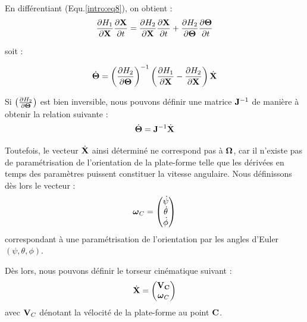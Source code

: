 En différentiant (Equ.\ref{intro:eq8}), on obtient :
\begin{equation}
\frac{\partial H_1}{\partial {\bf X}} \frac{\partial {\bf X}}{\partial t} 
=  \frac{\partial H_2}{\partial {\bf X}} \frac{\partial {\bf X}}{\partial t} + 
\frac{\partial H_2}{\partial {\bf \Theta}} \frac{\partial {\bf 
\Theta}}{\partial t}
\label{intro:eq9}
\end{equation}

soit :

\begin{equation}
\dot {\bf \Theta} = \left ( \frac{\partial H_2}{\partial {\bf \Theta}} \right 
)^{-1} \left (\frac{\partial H_1}{\partial {\bf X}} - \frac{\partial 
H_2}{\partial {\bf X}} \right ) \dot {\bf X}
\label{intro:eq10}
\end{equation}

Si $\left ( \frac{\partial H_2}{\partial {\bf \Theta}} \right )$ est bien 
inversible, nous pouvons définir une matrice ${\bf J}^{-1}$ de manière à 
obtenir la 
relation suivante :
\begin{equation}
\dot {\bf \Theta} = {\bf J}^{-1} \dot {\bf X}
\label{intro:eq11}
\end{equation}

Toutefois, le vecteur $\dot {\bf X}$ ainsi d\'etermin\'e ne correspond pas \`a 
$\bf \Omega$, car il n'existe pas de paramétrisation de l'orientation de la 
plate-forme telle que les dérivées en temps des paramètres puissent constituer 
la vitesse angulaire. Nous définissons dès lors le vecteur :
\begin{equation}
\hbox{\boldmath $\omega$}_C = \left ( \begin{matrix}
                \dot \psi \\
                \dot \theta \\
                \dot \phi       
               \end{matrix} \right )
\label{intro:eq11c}
\end{equation}
correspondant à une paramétrisation de l'orientation par les angles d'Euler 
$(\psi, \theta, \phi)$.

Dès lors, nous pouvons définir le torseur cinématique suivant :
\begin{equation}
\dot {\bf X} = \left ( \begin{matrix}
                {\bf V_C} \\
		{\hbox{\boldmath $\omega$}_C}
               \end{matrix} \right )
\label{intro:eq11d}
\end{equation}
avec ${\bf V}_C$ dénotant la vélocité de la plate-forme au point $\bf C$.

